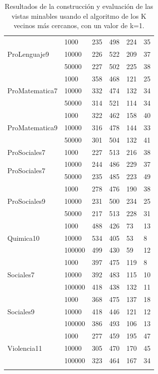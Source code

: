\begin{longtable}{|p{3cm}|p{3cm}|p{2cm}|p{2cm}|p{2cm}|p{2cm}|}
\hline
\multirow{3}[6]{*}{ProLenguaje9} & 1000  & 235   & 498   & 224   & 35 \\
\cline{2-6}      & 10000 & 226   & 522   & 209   & 37 \\
\cline{2-6}      & 50000 & 227   & 502   & 225   & 38 \\
\hline
\multirow{3}[6]{*}{ProMatematica7} & 1000  & 358   & 468   & 121   & 25 \\
\cline{2-6}      & 10000 & 332   & 474   & 132   & 34 \\
\cline{2-6}      & 50000 & 314   & 521   & 114   & 34 \\
\hline
\multirow{3}[6]{*}{ProMatematica9} & 1000  & 322   & 462   & 158   & 40 \\
\cline{2-6}      & 10000 & 316   & 478   & 144   & 33 \\
\cline{2-6}      & 50000 & 301   & 504   & 132   & 41 \\
\hline
ProSociales7 & 1000  & 227   & 513   & 216   & 38 \\
\multirow{2}[6]{*}{ProSociales7}      & 10000 & 244   & 486   & 229   & 37 \\
\cline{2-6}      & 50000 & 235   & 485   & 223   & 49 \\
\hline
\multirow{3}[6]{*}{ProSociales9} & 1000  & 278   & 476   & 190   & 38 \\
\cline{2-6}      & 10000 & 231   & 500   & 234   & 25 \\
\cline{2-6}      & 50000 & 217   & 513   & 228   & 31 \\
\hline
\multirow{3}[6]{*}{Quimica10} & 1000  & 488   & 426   & 73    & 13 \\
\cline{2-6}      & 10000 & 534   & 405   & 53    & 8 \\
\cline{2-6}      & 100000 & 499   & 430   & 59    & 12 \\
\hline
\multirow{3}[6]{*}{Sociales7} & 1000  & 397   & 475   & 119   & 8 \\
\cline{2-6}      & 10000 & 392   & 483   & 115   & 10 \\
\cline{2-6}      & 100000 & 418   & 438   & 132   & 11 \\
\hline
\multirow{3}[6]{*}{Sociales9} & 1000  & 368   & 475   & 137   & 18 \\
\cline{2-6}      & 10000 & 418   & 446   & 121   & 12 \\
\cline{2-6}      & 100000 & 386   & 493   & 106   & 13 \\
\hline
\multirow{3}[6]{*}{Violencia11} & 1000  & 277   & 459   & 195   & 47 \\
\cline{2-6}      & 10000 & 305   & 470   & 170   & 45 \\
\cline{2-6}      & 100000 & 323   & 464   & 167   & 34 \\
\hline
\caption{Resultados de la construcción y evaluación de las vistas minables usando el algoritmo de los K vecinos más cercanos, con un valor de k=1.}
\label{tab:cuadro34}
\end{longtable}

